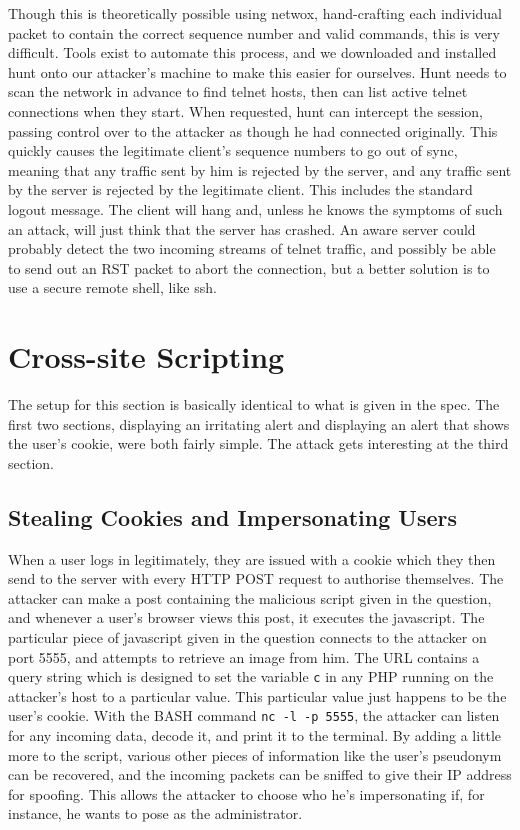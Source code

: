 Though this is theoretically possible using netwox, hand-crafting each individual packet to contain the correct sequence
number and valid commands, this is very difficult. Tools exist to automate this process, and we downloaded and installed
hunt onto our attacker's machine to make this easier for ourselves. Hunt needs to scan the network in advance to find
telnet hosts, then can list active telnet connections when they start. When requested, hunt can intercept the session,
passing control over to the attacker as though he had connected originally. This quickly causes the legitimate client's
sequence numbers to go out of sync, meaning that any traffic sent by him is rejected by the server, and any traffic sent
by the server is rejected by the legitimate client. This includes the standard logout message. The client will hang and,
unless he knows the symptoms of such an attack, will just think that the server has crashed. An aware server could
probably detect the two incoming streams of telnet traffic, and possibly be able to send out an RST packet to abort the
connection, but a better solution is to use a secure remote shell, like ssh.


\section{Cross-site Scripting}

The setup for this section is basically identical to what is given in the spec. The first two sections, displaying an
irritating alert and displaying an alert that shows the user's cookie, were both fairly simple. The attack gets
interesting at the third section.

\subsection{Stealing Cookies and Impersonating Users}

When a user logs in legitimately, they are issued with a cookie which they then send to the server with every HTTP POST
request to authorise themselves. The attacker can make a post containing the malicious script given in the question, and
whenever a user's browser views this post, it executes the javascript. The particular piece of javascript given in the
question connects to the attacker on port 5555, and attempts to retrieve an image from him. The URL contains a query
string which is designed to set the variable {\tt c} in any PHP running on the attacker's host to a particular value.
This particular value just happens to be the user's cookie. With the BASH command {\tt nc -l -p 5555}, the attacker can
listen for any incoming data, decode it, and print it to the terminal. By adding a little more to the script, various
other pieces of information like the user's pseudonym can be recovered, and the incoming packets can be sniffed to give
their IP address for spoofing. This allows the attacker to choose who he's impersonating if, for instance, he wants to
pose as the administrator.

